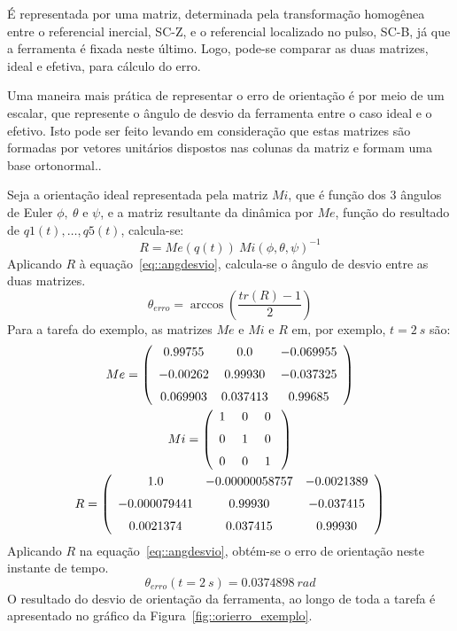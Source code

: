 É representada por uma matriz, determinada pela transformação homogênea entre o
referencial inercial, SC-Z, e o referencial localizado no pulso, SC-B, já que a
ferramenta é fixada neste último. Logo, pode-se comparar as duas matrizes, ideal
e efetiva, para cálculo do erro.

Uma maneira mais prática de representar o erro de orientação é por meio de um
escalar, que represente o ângulo de desvio da ferramenta entre o caso ideal e o
efetivo. Isto pode ser feito levando em consideração que estas matrizes são
formadas por vetores unitários dispostos nas colunas da matriz e formam uma
base ortonormal..

Seja a orientação ideal representada pela matriz $Mi$, que é função dos 3
ângulos de Euler $\phi,~\theta$ e $\psi$, e a matriz resultante da dinâmica por
$Me$, função do resultado de $q1(t),\ldots,q5(t)$, calcula-se:
%
\begin{equation}
	R = Me(q(t))~Mi(\phi,\theta,\psi)^{-1}
\end{equation}
%
Aplicando $R$ à equação~\ref{eq::angdesvio}, calcula-se o ângulo de desvio entre
as duas matrizes.
%
\begin{equation} \label{eq::angdesvio}
	\theta_{erro} = \arccos\left(\frac{tr(R)-1}{2}\right)
\end{equation}
%
Para a tarefa do exemplo, as matrizes $Me$ e $Mi$ e $R$ em, por exemplo,
$t=2~s$ são:
%
 \begin{gather*}
 Me = \left( \begin {array}{ccc}  0.99755& 0.0&- 0.069955
\\ \noalign{\medskip}- 0.00262& 0.99930&- 0.037325
\\ \noalign{\medskip} 0.069903& 0.037413& 0.99685\end {array} \right) \\
 Mi =  \left( \begin {array}{ccc}  1~& 0~& 0~\\ \noalign{\medskip} 0~&
 1~& 0~\\ \noalign{\medskip} 0~& 0~& 1~\end {array} \right) \\
R =  \left( \begin {array}{ccc}  1.0&- 0.00000058757&- 0.0021389
\\ \noalign{\medskip}- 0.000079441& 0.99930&- 0.037415
\\ \noalign{\medskip} 0.0021374& 0.037415& 0.99930\end {array}
 \right)
\end{gather*}
%
Aplicando $R$ na equação~\ref{eq::angdesvio}, obtém-se o erro de orientação
neste instante de tempo.
%
\begin{equation*}
	\theta_{erro}(t=2~s) = 0.0374898~rad
\end{equation*}
%
O resultado do desvio de orientação da ferramenta, ao longo de toda a tarefa é
apresentado no gráfico da Figura~\ref{fig::orierro_exemplo}.

